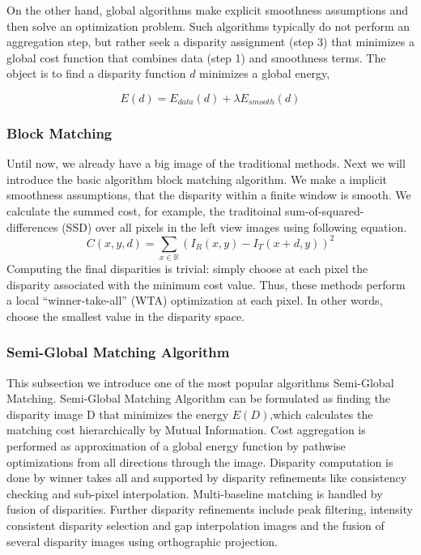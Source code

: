 On the other hand, global algorithms make explicit smoothness assumptions and then solve an optimization problem. Such algorithms typically do not perform an aggregation step, but rather seek a disparity assignment (step 3) that minimizes a global cost function that combines data (step 1) and smoothness terms. The object is to find a disparity function $d$ minimizes a global energy,

\begin{equation}
    E(d) = E_{data}(d) + \lambda E_{smooth}(d)
\end{equation}

\subsubsection{Block Matching}
\label{BM}
Until now, we already have a big image of the traditional methods. Next we will introduce the basic algorithm block matching algorithm. We make a implicit smoothness assumptions, that the disparity within a finite window is smooth. We calculate the summed cost, for example, the traditoinal sum-of-squared-differences (SSD) over all pixels in the left view images using following equation. 
\begin{equation}
    C(x, y, d) = \sum_{x \in \mathbb{R}} (I_R(x, y)-I_T(x+d, y))^2
\end{equation}
Computing the final disparities is trivial: simply choose at each pixel the disparity associated with the minimum cost value. Thus, these methods perform a local “winner-take-all”
(WTA) optimization at each pixel. In other words, choose the smallest value in the disparity space.  


\subsubsection{Semi-Global Matching Algorithm}
\label{Semi-Global Matching}
This subsection we introduce one of the most popular algorithms Semi-Global Matching. Semi-Global Matching Algorithm can be formulated as finding the disparity image D that minimizes the energy $E(D)$,which calculates the matching cost hierarchically by Mutual Information. Cost aggregation is performed as approximation of a global energy function by pathwise optimizations from all directions through the image. Disparity computation is done by winner takes all and supported by disparity refinements like consistency checking and sub-pixel interpolation. Multi-baseline matching is handled by fusion of disparities. Further disparity refinements include peak filtering, intensity consistent disparity selection and gap interpolation images and the fusion of several disparity images using orthographic projection\cite{hirschmuller2007stereo}. 

